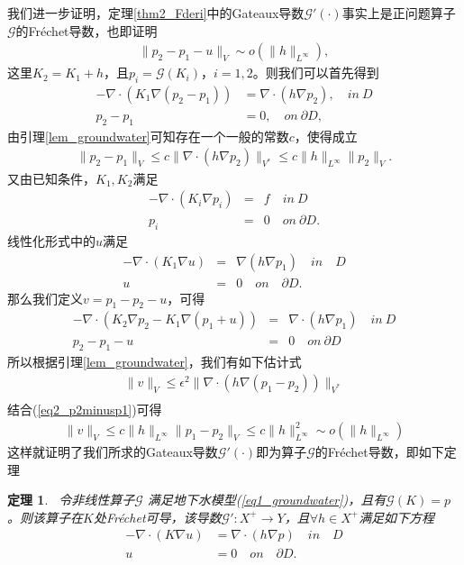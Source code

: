 \documentclass[a4paper,12pt,oneside,CJK]{cctbook}
\newtheorem{thm}  {\indent 定理}[section]
\theoremstyle{definition}
\numberwithin{equation}{section}
\begin{document}
我们进一步证明，定理\ref{thm2_Fderi}中的Gateaux导数$\mathcal{G}'(\cdot)$事实上是正问题算子$\mathcal{G}$的Fr\'{e}chet导数，也即证明
\begin{eqnarray}
   \|p_2-p_1- u\|_V\sim o(\|h\|_{L^{\infty}}),
\end{eqnarray}
这里$K_2 = K_1 + h$，且$p_i  = \mathcal{G}(K_i)$，$i=1,2$。则我们可以首先得到
\begin{align*}
-\nabla\cdot (K_1 \nabla (p_2-p_1)) & = \nabla\cdot (h\nabla p_2), \quad in ~D \\
p_2-p_1 & = 0,\quad on ~\partial D,
\end{align*}
由引理\ref{lem_groundwater}可知存在一个一般的常数$c$，使得成立
\begin{align}\label{eq2_p2minusp1}
\|p_2-p_1\|_{V} \leq c \|\nabla\cdot( h\nabla p_2)\|_{V^*} \leq c \|h\|_{L^{\infty}} \|p_2\|_{V}.
\end{align}
又由已知条件，$K_1,K_2$满足
\begin{eqnarray*}
   -\nabla\cdot(K_i\nabla p_i)&=&f \quad in~D\\
   p_i&=&0\quad on ~\partial D.
\end{eqnarray*}
线性化形式中的$u$满足
\begin{eqnarray*}
    -\nabla\cdot(K_1\nabla u)&=&\nabla(h\nabla p_1) \quad in\quad D\\
     u&=&0\quad on \quad \partial D.
\end{eqnarray*}
那么我们定义$v = p_1-p_2- u$，可得
\begin{eqnarray*}
   -\nabla\cdot(K_2\nabla p_2-K_1\nabla (p_1+ u))&=&\nabla\cdot(h\nabla p_1) \quad in~D\\
   p_2-p_1-u&=&0\quad on ~\partial D
\end{eqnarray*}
所以根据引理\ref{lem_groundwater}，我们有如下估计式
\begin{eqnarray*}
    \|v\|_V \leq \epsilon ^2 \|\nabla\cdot(h\nabla (p_1-p_2))\|_{V^*}\\
\end{eqnarray*}
结合(\ref{eq2_p2minusp1})可得
\begin{eqnarray*}
   \|v\|_{V} \leq c \|h\|_{L^{\infty}} \|p_1-p_2\|_V \leq c \|h\|_{L^{\infty}}^2 \sim o(\|h\|_{L^{\infty}})
\end{eqnarray*}
这样就证明了我们所求的Gateaux导数$\mathcal{G}'(\cdot)$即为算子$\mathcal{G}$的Fr\'{e}chet导数，即如下定理
\begin{thm}\label{thm2_Fderi2}~令非线性算子$\mathcal{G}$
满足地下水模型(\ref{eq1_groundwater})，且有$\mathcal{G}(K) = p$。则该算子在$K$处Fr\'{e}chet可导，该导数$\mathcal{G}' : X^+ \rightarrow Y$，且$\forall h\in X^+$满足如下方程
\begin{align*}
    -\nabla\cdot(K\nabla u)&=\nabla\cdot(h\nabla p) \quad in\quad D\\
     u&=0\quad on \quad \partial D.
\end{align*}
\end{thm}
\end{document}
